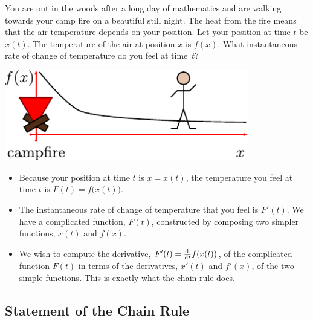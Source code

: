 \begin{eg}
\label{eg:DIFFcampfire}
You are out in the woods after a long day of mathematics and are
walking towards your camp fire on a beautiful still night. The heat
from the fire means that the air temperature depends on your position.
Let your position at time $t$ be $x(t)$. The temperature of the air
at position $x$ is $f(x)$. What instantaneous rate of change of
temperature do you feel at time~$t$?
\begin{efig}
\begin{center}
 \includegraphics[width=0.8\textwidth]{campfire2}
\end{center}
\end{efig}
\begin{itemize}
 \item Because your position at time $t$ is $x=x(t)$, the temperature you feel
at time $t$ is $F(t)=f\big(x(t)\big)$.
\item The instantaneous rate of change of temperature that you feel is $F'(t)$. We have a
complicated function, $F(t)$, constructed by composing two simpler functions, $x(t)$ and
$f(x)$.
\item We wish to compute the derivative, $F'(t) = \diff{}{t} f( x(t) )$,
of the complicated function $F(t)$ in terms of the derivatives,  $x'(t)$
and $f'(x)$, of the two simple functions. This is exactly what the
chain rule does.
\end{itemize}
\end{eg}


\subsection*{Statement of the Chain Rule}

